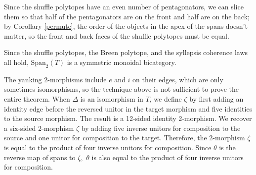 \documentclass[12pt,twoside,openright]{report}
\newcommand{\x}{\times}
\newcommand{\Span}{\mbox{Span}}
\begin{document}
Since the shuffle polytopes have an even number of pentagonators, we can slice them so that half of the pentagonators are on the front and half are on the back; by Corollary \ref{permute}, the order of the objects in the apex of the spans doesn't matter, so the front and back faces of the shuffle polytopes must be equal.

Since the shuffle polytopes, the Breen polytope, and the syllepsis coherence laws all hold, $\Span_2(T)$ is a symmetric monoidal bicategory.

\newcommand{\pb}[1]{\begin{tikzpicture}[dot/.style={fill,inner sep=1pt,circle}, scale=.2]
  \foreach \x / \y [remember=\x as \lastx(initially 0), count=\n] in {#1}
    \draw[\ifnum\y>0 black\else white\fi] (\lastx, 0) to[out=90,in=90,looseness=1.7] (\x, 0);
  \foreach \x in {0,...,\n} \draw[black] (\x,0) node[dot]{};
\end{tikzpicture}}

The yanking 2-morphisms include $e$ and $i$ on their edges, which are only sometimes isomorphisms, so the technique above is not sufficient to prove the entire theorem.  When $\Delta$ is an isomorphism in $T$, we define $\zeta$ by first adding an identity edge before the reversed unitor in the target morphism and five identities to the source morphism.  The result is a 12-sided identity 2-morphism.  We recover a six-sided 2-morphism $\zeta$ by adding five inverse unitors for composition to the source and one unitor for composition to the target.  Therefore, the 2-morphism $\zeta$ is equal to the product of four inverse unitors for composition.  Since $\theta$ is the reverse map of spans to $\zeta,$ $\theta$ is also equal to the product of four inverse unitors for composition.
\end{document}
